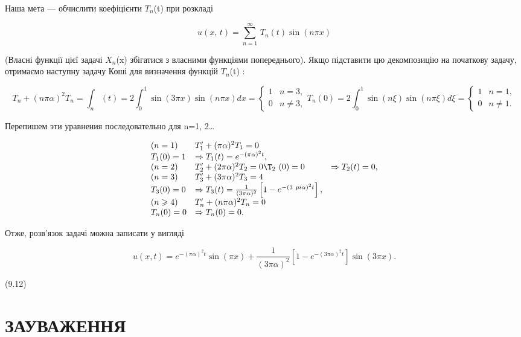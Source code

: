 \documentclass[
  ukrainian,
]{article}
\begin{document}
Наша мета --- обчислити коефіцієнти \(T_n\)(t) при розкладі

\[
u\left(x,\,t\right)=\sum_{n=1}^{\infty}\,T_{n}\left(t\right)\sin\left(n\pi x\right)
\]

(Власні функції цієї задачі \(X_n\)(x) збігатися з власними функціями
попереднього). Якщо підставити цю декомпозицію на початкову задачу,
отримаємо наступну задачу Коші для визначення функцій \(T_n\)(t) :

\[
T_n + (n\pi\alpha)^2 T_n = \int_n (t) = 2 \int_0^1 \sin(3\pi x) \sin(n\pi x) dx =
\begin{cases} 1 &n = 3, \\ 0 & n \neq 3, \end{cases}
T_n(0) = 2 \int_0^1 \sin(n\xi) \sin(n\pi\xi) d\xi =
\begin{cases} 1 &n = 1, \\ 0 & n \neq 1. \end{cases}
\]

Перепишем эти уравнения последовательно для n=1, 2\ldots{}

\[
\begin{array}{lll} (n=1) & T_1' + (\pi\alpha)^2 T_1 = 0 \\ T_1(0) = 1 & \Rightarrow T_1(t) = e^{-(\pi\alpha)^2 t}, \\ (n=2) & T_2' + (2\pi\alpha)^2 T_2 = 0 \T_2\  (0) = 0 & \Rightarrow T_2(t) = 0, \\ (n=3) & T_3' + (3\pi\alpha)^2 T_3 = 4 \\ T_3(0) = 0 & \Rightarrow T_3(t) = \frac{1}{(3\pi\alpha)^2} \left[1 - e^{-(3\ pi\alpha)^2 t}\right], \\ (n \geqslant 4) & T_n' + (n\pi\alpha)^2 T_n = 0 \\ T_n(0) = 0 & \Rightarrow T_n(0) = 0. \end{array}
\]

Отже, розв'язок задачі можна записати у вигляді

\[
u(x, t) = e^{-(\pi\alpha)^2 t} \sin(\pi x) + \frac{1}{(3\pi\alpha)^2} [1 - e^{-(3\pi\alpha)^2 t}] \sin(3\pi x).
\]

(9.12)

\section{ЗАУВАЖЕННЯ}\label{ux437ux430ux443ux432ux430ux436ux435ux43dux43dux44f-6}
\end{document}
